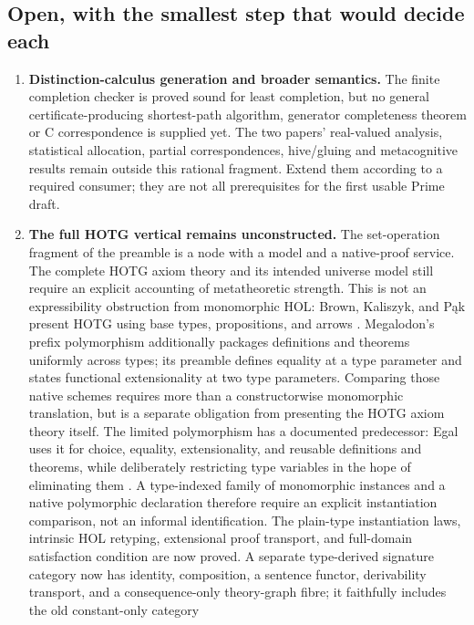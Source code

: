 \documentclass[11pt]{article}
\theoremstyle{definition}
\theoremstyle{remark}
\begin{document}
\subsection{Open, with the smallest step that would decide each}

\begin{enumerate}
\item \textbf{Distinction-calculus generation and broader semantics.}
  The finite completion checker is proved sound for least completion, but
  no general certificate-producing shortest-path algorithm, generator
  completeness theorem or C correspondence is supplied yet. The two
  papers' real-valued analysis, statistical allocation, partial
  correspondences, hive/gluing and metacognitive results remain outside
  this rational fragment. Extend them according to a required consumer;
  they are not all prerequisites for the first usable Prime draft.
\item \textbf{The full HOTG vertical remains unconstructed.}  The set-operation
  fragment of the preamble is a node with a model and a native-proof
  service. The complete HOTG axiom theory and its intended universe model
  still require an explicit accounting of metatheoretic strength.
  This is not an expressibility obstruction from monomorphic HOL:
  Brown, Kaliszyk, and P\k{a}k present HOTG using base types, propositions,
  and arrows \cite{BrownKaliszykPakHOTG}. Megalodon's prefix polymorphism
  additionally packages definitions and theorems uniformly across types;
  its preamble defines equality at a type parameter and states functional
  extensionality at two type parameters. Comparing those native schemes
  requires more than a constructorwise monomorphic translation, but is a
  separate obligation from presenting the HOTG axiom theory itself.
  The limited polymorphism has a documented predecessor: Egal uses it for
  choice, equality, extensionality, and reusable definitions and theorems,
  while deliberately restricting type variables in the hope of eliminating
  them \cite{BrownPakTwoSetTheories}. A type-indexed family of monomorphic
  instances and a native polymorphic declaration therefore require an
  explicit instantiation comparison, not an informal identification.
  The plain-type instantiation laws, intrinsic HOL retyping, extensional
  proof transport, and full-domain satisfaction condition are now proved.
  A separate type-derived signature category now has identity, composition,
  a sentence functor, derivability transport, and a consequence-only
  theory-graph fibre; it faithfully includes the old constant-only category

\end{enumerate}
\end{document}
